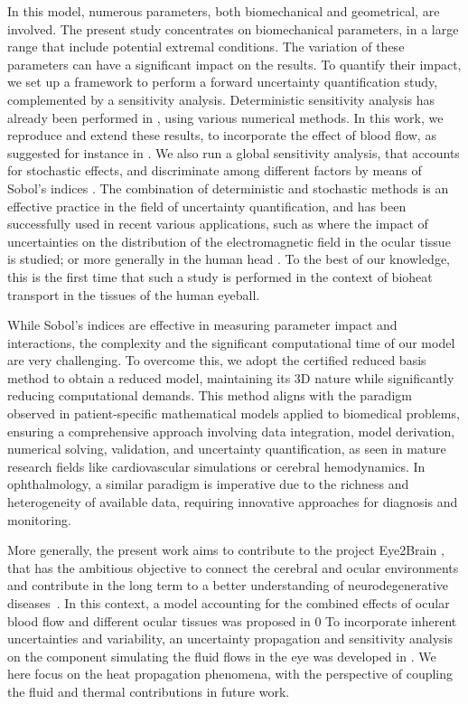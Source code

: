 In this model, numerous parameters, both biomechanical and geometrical, are involved.
The present study concentrates on biomechanical parameters, in a large range that include potential extremal conditions.
The variation of these parameters can have a significant impact on the results.
To quantify their impact, we set up a framework to perform a forward uncertainty quantification study, complemented by a sensitivity analysis.
Deterministic sensitivity analysis has already been performed in \cite{Scott_1988, NG2006268, NG2007829, li2010}, using various numerical methods.
In this work, we reproduce and extend these results, to incorporate the effect of blood flow, as suggested for instance in \cite{Scott_1988}.
We also run a global sensitivity analysis, that accounts for stochastic effects, and discriminate among different factors by means of Sobol's indices \cite{Sobol1993SensitivityEF}.
The combination of deterministic and stochastic methods is an effective practice in the field of uncertainty quantification, and has been successfully used in recent various applications, such as \cite{DODIG201448} where the impact of uncertainties on the distribution of the electromagnetic field in the ocular tissue is studied;
or more generally in the human head \cite{SUSNJARA20221,9522096}.
To the best of our knowledge, this is the first time that such a study is performed in the context of bioheat transport in the tissues of the human eyeball.

While Sobol's indices are effective in measuring parameter impact and interactions, the complexity and the significant computational time of our model are very challenging.
To overcome this, we adopt the certified reduced basis method \cite{10.1115/1.1448332, Quarteroni2016} to obtain a reduced model, maintaining its 3D nature while significantly reducing computational demands.
This method aligns with the paradigm observed in patient-specific mathematical models applied to biomedical problems,
ensuring a comprehensive approach involving data integration, model derivation, numerical solving, validation, and uncertainty quantification, as seen in mature research fields like cardiovascular simulations or cerebral hemodynamics.
In ophthalmology, a similar paradigm is imperative due to the richness and heterogeneity of available data, requiring innovative approaches for diagnosis and monitoring.

More generally, the present work aims to contribute to the project Eye2Brain \cite{eye2brain},
that has the ambitious objective to connect the cerebral and ocular environments and contribute in the long term to a better understanding of neurodegenerative diseases~\cite{Guidoboni2020-vr}.
In this context, a model accounting for the combined effects of ocular blood flow and different ocular tissues was proposed in \cite{https://doi.org/10.1002/cnm.3791}0
To incorporate inherent uncertainties and variability, an uncertainty propagation and sensitivity analysis on the component simulating the fluid flows in the eye was developed in \cite{MBE2021}.
We here focus on the heat propagation phenomena, with the perspective of coupling the fluid and thermal contributions in future work.%

